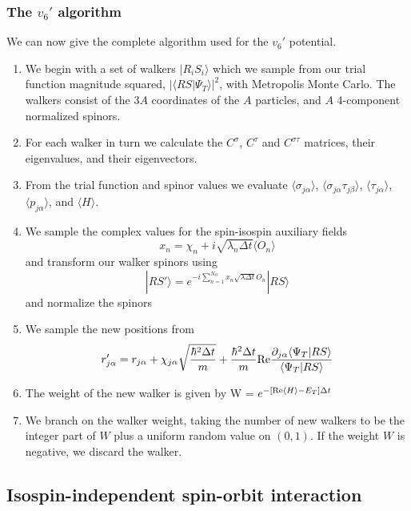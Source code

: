  \subsubsection{The $v_6'$ algorithm}
 We can now give the complete algorithm used for the $v_6'$ potential.
 \begin{enumerate}
 	\item
 	We begin with a set of walkers $|R_iS_i\rangle$ which we sample from
 	our trial function magnitude
 	squared, $|\langle R S|\Psi_T\rangle|^2$, with Metropolis
 	Monte Carlo. The walkers consist of the $3A$ coordinates of the
 	$A$ particles, and $A$ 4-component normalized spinors.
 	\item
 	For each walker in turn we calculate the $C^\sigma$, $C^\tau$ and
 	$C^{\sigma\tau}$ matrices, their eigenvalues, and their eigenvectors.
 	\item
 	From the trial function and spinor values
 	we evaluate $\langle \sigma_{j\alpha}\rangle$,
 	$\langle \sigma_{j\alpha}\tau_{j\beta}\rangle$, $\langle \tau_{j\alpha}\rangle$,
 	$\langle p_{j\alpha}\rangle$, and $\langle H\rangle$.
 	\item
 	We sample the complex values for the spin-isospin auxiliary fields
 	\begin{equation}
 	x_n  = \chi_n + i\sqrt{\lambda_n \Delta t}\langle O_n\rangle
 	\end{equation}
 	and transform our walker spinors using
 	\begin{equation}
 	|RS'\rangle =
 	e^{-i\sum_{n=1}^{N_O} x_n\sqrt{\lambda \Delta t} O_n} |RS\rangle
 	\end{equation}
 	and normalize the spinors
 	\item
 	We sample the new positions from
 	\begin{equation}
 	r_{j\alpha}' = 
 	r_{j\alpha}+ \chi_{j\alpha} \sqrt{\frac{\hbar^2 \Delta t}{m}}
 	+
 	\frac{\hbar^2 \Delta t}{m}
 	{\rm Re} \frac{\partial_{j\alpha} \langle \Psi_T |RS\rangle}
 	{\langle \Psi_T |RS\rangle}
 	\end{equation}
 	\item
 	The weight of the new walker is given by
 	W = $e^{- [{\rm Re} \langle H \rangle - E_T]\Delta t}$
 	\item
 	We branch on the walker weight, taking the number of new walkers
 	to be the integer part of $W$ plus a uniform random value on $(0,1)$.
 	If the weight $W$ is negative, we discard the walker.
 \end{enumerate}
 
 \subsection{Isospin-independent spin-orbit interaction}
 
